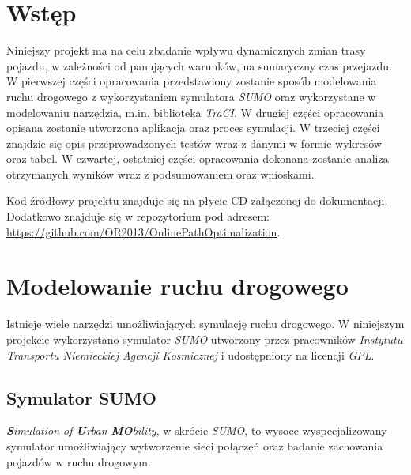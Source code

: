 \documentclass[11pt,a4paper]{article}
\begin{document}


\tableofcontents
\newpage

\section{Wstęp}

Niniejszy projekt ma na celu zbadanie wpływu dynamicznych zmian trasy pojazdu, w zależności od panujących warunków, na sumaryczny czas przejazdu. W pierwszej części opracowania przedstawiony zostanie sposób modelowania ruchu drogowego z wykorzystaniem symulatora \emph{SUMO} oraz wykorzystane w modelowaniu narzędzia, m.in. biblioteka \emph{TraCI}. W drugiej części opracowania opisana zostanie utworzona aplikacja oraz proces symulacji. W trzeciej części znajdzie się opis przeprowadzonych testów wraz z danymi w formie wykresów oraz tabel. W czwartej, ostatniej części opracowania dokonana zostanie analiza otrzymanych wyników wraz z podsumowaniem oraz wnioskami.

Kod źródłowy projektu znajduje się na płycie CD załączonej do dokumentacji. Dodatkowo znajduje się w repozytorium pod adresem: \url{https://github.com/OR2013/OnlinePathOptimalization}.

\section{Modelowanie ruchu drogowego}

Istnieje wiele narzędzi umożliwiających symulację ruchu drogowego. W niniejszym projekcie wykorzystano symulator \emph{SUMO} utworzony przez pracowników \emph{Instytutu Transportu Niemieckiej Agencji Kosmicznej} i udostępniony na licencji \emph{GPL}.

\subsection{Symulator SUMO}

\emph{\textbf{S}imulation of \textbf{U}rban \textbf{MO}bility}, w skrócie \emph{SUMO}, to wysoce wyspecjalizowany symulator umożliwiający wytworzenie sieci połączeń oraz badanie zachowania pojazdów w ruchu drogowym.\\[0.2cm]
\end{document}
